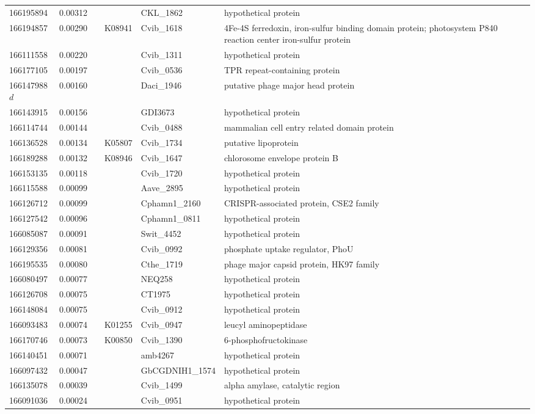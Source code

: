 \begin{landscape}
\begin{longtable}{p{1.8cm}p{0.9cm}p{2.2cm}p{1cm}p{2.8cm}p{13.4cm}}
166195894&0.00312&&&CKL\_1862&hypothetical protein \\
166194857&0.00290&&K08941&Cvib\_1618&4Fe-4S ferredoxin, iron-sulfur binding domain protein; photosystem P840 reaction center iron-sulfur protein \\
166111558&0.00220&&&Cvib\_1311&hypothetical protein \\
166177105&0.00197&&&Cvib\_0536&TPR repeat-containing protein \\
166147988$d$&0.00160&&&Daci\_1946&putative phage major head protein \\
166143915&0.00156&&&GDI3673&hypothetical protein \\
166114744&0.00144&&&Cvib\_0488&mammalian cell entry related domain protein \\
166136528&0.00134&&K05807&Cvib\_1734&putative lipoprotein \\
166189288&0.00132&&K08946&Cvib\_1647&chlorosome envelope protein B \\
166153135&0.00118&&&Cvib\_1720&hypothetical protein \\
166115588&0.00099&&&Aave\_2895&hypothetical protein \\
166126712&0.00099&&&Cphamn1\_2160&CRISPR-associated protein, CSE2 family \\
166127542&0.00096&&&Cphamn1\_0811&hypothetical protein \\
166085087&0.00091&&&Swit\_4452&hypothetical protein \\
166129356&0.00081&&&Cvib\_0992&phosphate uptake regulator, PhoU \\
166195535&0.00080&&&Cthe\_1719&phage major capsid protein, HK97 family \\
166080497&0.00077&&&NEQ258&hypothetical protein \\
166126708&0.00075&&&CT1975&hypothetical protein \\
166148084&0.00075&&&Cvib\_0912&hypothetical protein \\
166093483&0.00074&&K01255&Cvib\_0947&leucyl aminopeptidase \\
166170746&0.00073&&K00850&Cvib\_1390&6-phosphofructokinase \\
166140451&0.00071&&&amb4267&hypothetical protein \\
166097432&0.00047&&&GbCGDNIH1\_1574&hypothetical protein \\
166135078&0.00039&&&Cvib\_1499&alpha amylase, catalytic region \\
166091036&0.00024&&&Cvib\_0951&hypothetical protein \\

\end{longtable}
\end{landscape}
